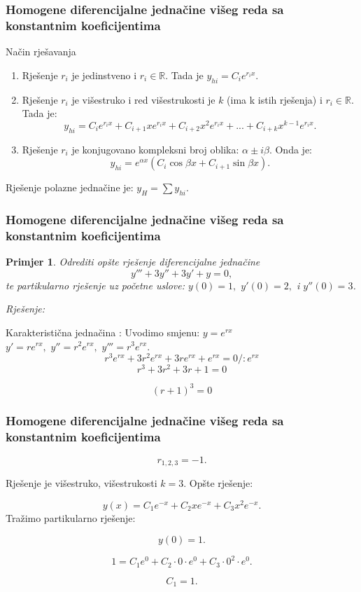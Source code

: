 \documentclass{beamer}
\newtheorem{pri}{\textrm{Primjer}}[section]
\begin{document}
\begin{frame}
\frametitle{Homogene diferencijalne jednačine višeg reda sa konstantnim koeficijentima} 
\begin{alertblock}{Način rješavanja}\begin{enumerate}
    \item Rješenje $r_i$ je jedinstveno i $r_i \in \mathbb{R}$. Tada je $y_{hi} = C_{i}e^{r_ix}.$
    \item  Rješenje $r_i$ je višestruko i red višestrukosti je $k$ (ima k istih rješenja) i  $r_i \in \mathbb{R}$. Tada je: $$y_{hi} = C_{i}e^{r_ix} + C_{i + 1}xe^{r_ix} +  C_{i + 2}x^{2}e^{r_ix} +...+ C_{i + k}x^{k-1}e^{r_ix}  .$$
    \item Rješenje $r_i$ je konjugovano kompleksni broj oblika: $\alpha \pm i\beta$. Onda je: $$y_{hi} = e^{\alpha x}(C_{i} \cos{\beta x} + C_{i+1} \sin{\beta x}).$$ 
\end{enumerate}
Rješenje polazne jednačine je: $y_{H}= \sum{y_{hi}}.$
\end{alertblock}
\end{frame}
\begin{frame}
\frametitle{Homogene diferencijalne jednačine višeg reda sa konstantnim koeficijentima} 

\begin{pri}
Odrediti opšte rješenje diferencijalne jednačine $$y''' + 3y'' + 3y' + y = 0,$$ te partikularno
 rješenje uz početne uslove: $y(0) = 1, $ $y'(0) = 2,$ i $y''(0) = 3$.
\end{pri}
\emph{Rješenje:}

Karakteristična jednačina : 
Uvodimo smjenu: $y= e^{rx}$ \\
$y'= re^{rx }, $ $y''= r^{2}e^{rx }, $ $y'''= r^{3}e^{rx }. $
$$r^{3}e^{rx } + 3r^{2}e^{rx } + 3re^{rx } + e^{rx } = 0 / : e^{rx }$$
$$r^{3} + 3r^{2} + 3r + 1 = 0$$

$$(r + 1)^{3} = 0$$ 
\end{frame}
\begin{frame}
\frametitle{Homogene diferencijalne jednačine višeg reda sa konstantnim koeficijentima} 
 
 $$r_{1,2,3} = -1.$$  
 
 Rješenje je višestruko, višestrukosti $k=3.$ 
 Opšte rješenje: 
 
$$y(x) = C_{1}e^{-x} + C_{2}xe^{-x} + C_{3}x^{2}e^{-x}.$$
Tražimo partikularno rješenje:

$$y(0) = 1.$$

$$1 = C_{1}e^{0} + C_{2}\cdot 0 \cdot e^{0}+ C_{3} \cdot0^{2} \cdot e^{0}.$$

$$ C_{1} = 1 .$$
\end{frame}
\end{document}
